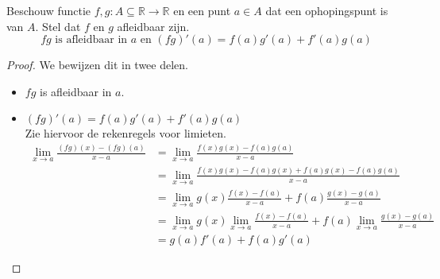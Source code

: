\documentclass[main.tex]{subfiles}
\begin{document}
\begin{pr}
  Beschouw functie $f,g: A \subseteq \mathbb{R} \rightarrow \mathbb{R}$ en een punt $a\in A$ dat een ophopingspunt is van $A$.
  Stel dat $f$ en $g$ afleidbaar zijn.
  \[ fg \text{ is afleidbaar in } a \text{ en } (fg)'(a) = f(a) g'(a) + f'(a)g(a) \]

  \begin{proof}
    We bewijzen dit in twee delen.
    \begin{itemize}
    \item $fg$ is afleidbaar in $a$.
    \item $(fg)'(a) = f(a) g'(a) + f'(a)g(a)$\\
      Zie hiervoor de rekenregels voor limieten.
      \[
      \begin{array}{rl}
        \lim_{x \rightarrow a}\frac{(fg)(x)-(fg)(a)}{x-a}
        &= \lim_{x \rightarrow a}\frac{f(x)g(x)-f(a)g(a)}{x-a}\\
        &= \lim_{x \rightarrow a}\frac{f(x)g(x)-f(a)g(x)+f(a)g(x) -f(a)g(a)}{x-a}\\
        &= \lim_{x \rightarrow a}g(x)\frac{f(x)-f(a)}{x-a} + f(a)\frac{g(x) -g(a)}{x-a}\\
        &= \lim_{x \rightarrow a}g(x)\lim_{x \rightarrow a}\frac{f(x)-f(a)}{x-a} + f(a)\lim_{x \rightarrow a}\frac{g(x) -g(a)}{x-a}\\
        &= g(a)f'(a) + f(a)g'(a)
      \end{array}
      \]
    \end{itemize}
  \end{proof}
\end{pr}
\end{document}
